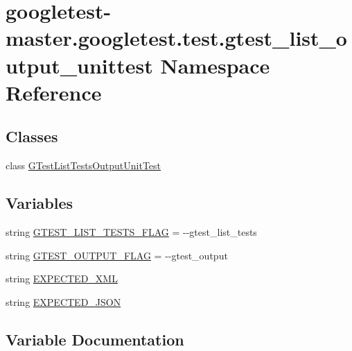 \hypertarget{namespacegoogletest-master_1_1googletest_1_1test_1_1gtest__list__output__unittest}{}\section{googletest-\/master.googletest.\+test.\+gtest\+\_\+list\+\_\+output\+\_\+unittest Namespace Reference}
\label{namespacegoogletest-master_1_1googletest_1_1test_1_1gtest__list__output__unittest}
\subsection*{Classes}
\begin{DoxyCompactItemize}
\item 
class \mbox{\hyperlink{classgoogletest-master_1_1googletest_1_1test_1_1gtest__list__output__unittest_1_1_g_test_list_tests_output_unit_test}{G\+Test\+List\+Tests\+Output\+Unit\+Test}}
\end{DoxyCompactItemize}
\subsection*{Variables}
\begin{DoxyCompactItemize}
\item 
string \mbox{\hyperlink{namespacegoogletest-master_1_1googletest_1_1test_1_1gtest__list__output__unittest_a89dd3d6eb6cd880f8ac71db9e2ffccc0}{G\+T\+E\+S\+T\+\_\+\+L\+I\+S\+T\+\_\+\+T\+E\+S\+T\+S\+\_\+\+F\+L\+AG}} = \textquotesingle{}-\/-\/gtest\+\_\+list\+\_\+tests\textquotesingle{}
\item 
string \mbox{\hyperlink{namespacegoogletest-master_1_1googletest_1_1test_1_1gtest__list__output__unittest_a144a401f9fa9fd2eb13333eb76c33cc2}{G\+T\+E\+S\+T\+\_\+\+O\+U\+T\+P\+U\+T\+\_\+\+F\+L\+AG}} = \textquotesingle{}-\/-\/gtest\+\_\+output\textquotesingle{}
\item 
string \mbox{\hyperlink{namespacegoogletest-master_1_1googletest_1_1test_1_1gtest__list__output__unittest_a3862058e035fbbd406ad87b044c9feb8}{E\+X\+P\+E\+C\+T\+E\+D\+\_\+\+X\+ML}}
\item 
string \mbox{\hyperlink{namespacegoogletest-master_1_1googletest_1_1test_1_1gtest__list__output__unittest_a27308cd6794151789f7d93fad3df7121}{E\+X\+P\+E\+C\+T\+E\+D\+\_\+\+J\+S\+ON}}
\end{DoxyCompactItemize}


\subsection{Variable Documentation}
\mbox{\label{namespacegoogletest-master_1_1googletest_1_1test_1_1gtest__list__output__unittest_a27308cd6794151789f7d93fad3df7121}} 
